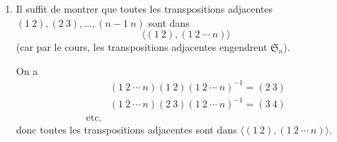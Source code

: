 {\begin{td-sol}[]
\begin{enumerate}
            Conclusion: on a \(\forall j\in\{1,\ldots,n\}, \alpha(j) = \beta(j)\) donc \(\alpha = \beta\).

            \begin{remark}[Ca sort d'où?]
                Soient deux ensembles \(E\) et \(F\) de cardinal fini \(n\).
                Soit \(\sigma\colon E\to F\) une bijection. 

                Soit \(f\in \text{Bij}(E)\). Alors, \(\sigma f \sigma^{-1}\) est une bijection de \(F\).

                Slogan: ``\(\sigma f \sigma^{-1}\), c'est comme \(f\), après avoir renommé les éléments''.

                En effet, notons \(E = \{x_1,\ldots,x_n\}\) et \(F = \{y_1,\ldots,y_n\}\) avec \(\sigma(x_i) = y_i\).

                Si \(f(x_i) = x_j\) alors
                \begin{equation*}
                    (\sigma f \sigma^{-1})(y_i) = (\sigma f)(x_i) = \sigma(f(x_i)) = \sigma(x_j) = y_j
                \end{equation*}
                et
                \begin{equation*}
                    (\sigma f \sigma^{-1})(y_i) = y_j
                \end{equation*}
            \end{remark}

            \item Il suffit de montrer que toutes les transpositions adjacentes 
            \((1~2), (2~3), \ldots, (n-1~n)\) sont dans
            \begin{equation*}
                \langle (1~2), (1~2~\cdots~n)\rangle
            \end{equation*}
            (car par le cours, les transpositions adjacentes engendrent \(\mathfrak{S}_n\)).

            On a
            \begin{equation*}
                \begin{aligned}
                    &(1~2~\cdots~n)(1~2){(1~2~\cdots~n)}^{-1} = (2~3)\\
                    &(1~2~\cdots~n)(2~3){(1~2~\cdots~n)}^{-1} = (3~4)\\
                    \text{etc.}
                \end{aligned}
            \end{equation*}
            donc toutes les transpositions adjacentes sont dans \(\langle (1~2), (1~2~\cdots~n)\rangle\).


\end{enumerate}
\end{td-sol}}

